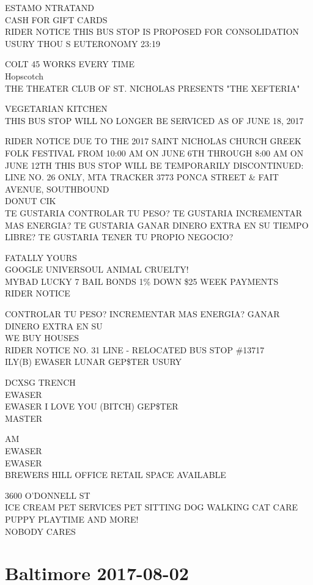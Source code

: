 \documentclass[10pt,letterpaper]{article}
\begin{document}
ESTAMO NTRATAND\\
CASH FOR GIFT CARDS\\
RIDER NOTICE THIS BUS STOP IS PROPOSED FOR CONSOLIDATION\\
USURY THOU S EUTERONOMY 23:19

COLT 45 WORKS EVERY TIME\\
Hopscotch\\
THE THEATER CLUB OF ST. NICHOLAS PRESENTS "THE XEFTERIA"

VEGETARIAN KITCHEN\\
THIS BUS STOP WILL NO LONGER BE SERVICED AS OF JUNE 18, 2017

RIDER NOTICE DUE TO THE 2017 SAINT NICHOLAS CHURCH GREEK FOLK FESTIVAL FROM 10:00 AM ON JUNE 6TH THROUGH 8:00 AM ON JUNE 12TH THIS BUS STOP WILL BE TEMPORARILY DISCONTINUED: LINE NO. 26 ONLY, MTA TRACKER 3773 PONCA STREET \& FAIT AVENUE, SOUTHBOUND\\
DONUT CIK\\
TE GUSTARIA CONTROLAR TU PESO?  TE GUSTARIA INCREMENTAR MAS ENERGIA?  TE GUSTARIA GANAR DINERO EXTRA EN SU TIEMPO LIBRE?  TE GUSTARIA TENER TU PROPIO NEGOCIO?

FATALLY YOURS\\
GOOGLE UNIVERSOUL ANIMAL CRUELTY!\\
MYBAD LUCKY 7 BAIL BONDS 1\% DOWN \$25 WEEK PAYMENTS\\
RIDER NOTICE

CONTROLAR TU PESO? INCREMENTAR MAS ENERGIA? GANAR DINERO EXTRA EN SU\\
WE BUY HOUSES\\
RIDER NOTICE NO. 31 LINE {-} RELOCATED BUS STOP \#13717\\
ILY(B) EWASER LUNAR GEP\$TER USURY

DCXSG TRENCH\\
EWASER\\
EWASER I LOVE YOU (BITCH) GEP\$TER\\
MASTER

AM\\
EWASER\\
EWASER\\
BREWERS HILL OFFICE RETAIL SPACE AVAILABLE

3600 O'DONNELL ST\\
ICE CREAM PET SERVICES PET SITTING DOG WALKING CAT CARE PUPPY PLAYTIME AND MORE!\\
NOBODY CARES
\

\section*{Baltimore 2017-08-02}
\end{document}
